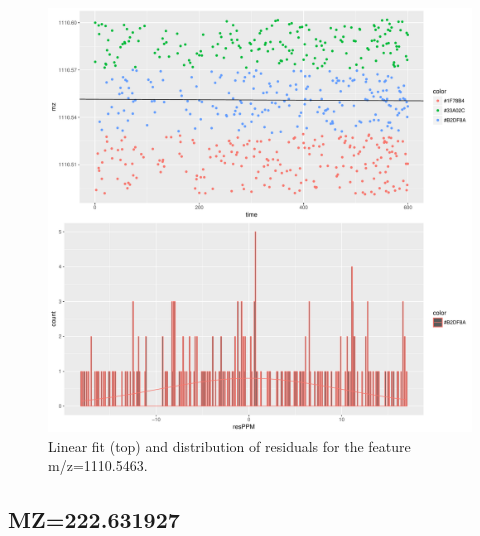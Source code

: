 \documentclass[]{article}
\begin{document}
\begin{figure}[H]
\begin{center}
\includegraphics{Supplementary_document_files/figure-latex/filter.lm.1110-1.pdf}
\caption{Linear fit (top) and distribution of residuals for the  feature m/z=1110.5463.}
\label{ig:chk.mz.1110.5463}
\end{center}
\end{figure}


\subsection{MZ=222.631927}\label{mz222.631927}
\end{document}
